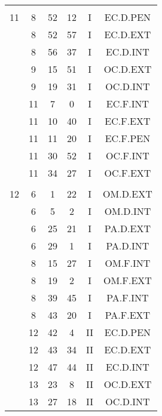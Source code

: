 \documentclass[12pt, a4paper]{article}
\begin{document}
\begin{multicols}{3}
{\begin{tabular}{c c c c c c}
	 	 	 	 & & & & & \\%
	 	 	 	11 & 8 & 52 & 12 & I & EC.D.PEN\\%
	 	 	 	 & 8 & 52 & 57 & I & EC.D.EXT\\%
	 	 	 	 & 8 & 56 & 37 & I & EC.D.INT\\%
	 	 	 	 & 9 & 15 & 51 & I & OC.D.EXT\\%
	 	 	 	 & 9 & 19 & 31 & I & OC.D.INT\\%
	 	 	 	 & 11 & 7 & 0 & I & EC.F.INT\\%
	 	 	 	 & 11 & 10 & 40 & I & EC.F.EXT\\%
	 	 	 	 & 11 & 11 & 20 & I & EC.F.PEN\\%
	 	 	 	 & 11 & 30 & 52 & I & OC.F.INT\\%
	 	 	 	 & 11 & 34 & 27 & I & OC.F.EXT\\%
	 	 	 	 & & & & & \\%
	 	 	 	12 & 6 & 1 & 22 & I & OM.D.EXT\\%
	 	 	 	 & 6 & 5 & 2 & I & OM.D.INT\\%
	 	 	 	 & 6 & 25 & 21 & I & PA.D.EXT\\%
	 	 	 	 & 6 & 29 & 1 & I & PA.D.INT\\%
	 	 	 	 & 8 & 15 & 27 & I & OM.F.INT\\%
	 	 	 	 & 8 & 19 & 2 & I & OM.F.EXT\\%
	 	 	 	 & 8 & 39 & 45 & I & PA.F.INT\\%
	 	 	 	 & 8 & 43 & 20 & I & PA.F.EXT\\%
	 	 	 	 & 12 & 42 & 4 & II & EC.D.PEN\\%
	 	 	 	 & 12 & 43 & 34 & II & EC.D.EXT\\%
	 	 	 	 & 12 & 47 & 44 & II & EC.D.INT\\%
	 	 	 	 & 13 & 23 & 8 & II & OC.D.EXT\\%
	 	 	 	 & 13 & 27 & 18 & II & OC.D.INT\\%
	 	 \end{tabular}
 	}
\end{multicols}
\end{document}
